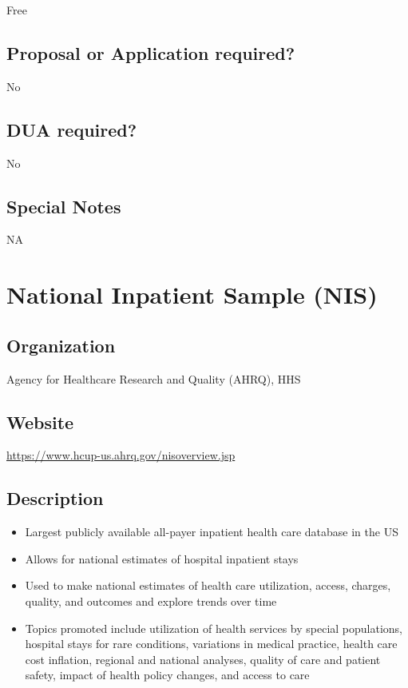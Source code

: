 \documentclass[
]{book}
\providecommand{\tightlist}{%
  \setlength{\itemsep}{0pt}\setlength{\parskip}{0pt}}
\begin{document}
Free

\hypertarget{proposal-or-application-required-54}{%
\section{Proposal or Application required?}\label{proposal-or-application-required-54}}

No

\hypertarget{dua-required-54}{%
\section{DUA required?}\label{dua-required-54}}

No

\hypertarget{special-notes-54}{%
\section{Special Notes}\label{special-notes-54}}

NA

\mainmatter

\hypertarget{national-inpatient-sample-nis}{%
\chapter{National Inpatient Sample (NIS)}\label{national-inpatient-sample-nis}}

\hypertarget{organization-55}{%
\section{Organization}\label{organization-55}}

Agency for Healthcare Research and Quality (AHRQ), HHS

\hypertarget{website-55}{%
\section{Website}\label{website-55}}

\url{https://www.hcup-us.ahrq.gov/nisoverview.jsp}

\hypertarget{description-55}{%
\section{Description}\label{description-55}}

\begin{itemize}
\tightlist
\item
  Largest publicly available all-payer inpatient health care database in the US
\item
  Allows for national estimates of hospital inpatient stays
\item
  Used to make national estimates of health care utilization, access, charges, quality, and outcomes and explore trends over time
\item
  Topics promoted include utilization of health services by special populations, hospital stays for rare conditions, variations in medical practice, health care cost inflation, regional and national analyses, quality of care and patient safety, impact of health policy changes, and access to care
\end{itemize}
\end{document}

